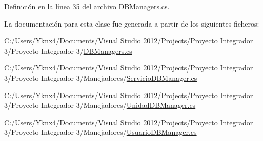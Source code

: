 Definición en la línea 35 del archivo D\-B\-Managers.\-cs.



La documentación para esta clase fue generada a partir de los siguientes ficheros\-:\begin{DoxyCompactItemize}
\item 
C\-:/\-Users/\-Yknx4/\-Documents/\-Visual Studio 2012/\-Projects/\-Proyecto Integrador 3/\-Proyecto Integrador 3/\hyperlink{_d_b_managers_8cs}{D\-B\-Managers.\-cs}\item 
C\-:/\-Users/\-Yknx4/\-Documents/\-Visual Studio 2012/\-Projects/\-Proyecto Integrador 3/\-Proyecto Integrador 3/\-Manejadores/\hyperlink{_servicio_d_b_manager_8cs}{Servicio\-D\-B\-Manager.\-cs}\item 
C\-:/\-Users/\-Yknx4/\-Documents/\-Visual Studio 2012/\-Projects/\-Proyecto Integrador 3/\-Proyecto Integrador 3/\-Manejadores/\hyperlink{_unidad_d_b_manager_8cs}{Unidad\-D\-B\-Manager.\-cs}\item 
C\-:/\-Users/\-Yknx4/\-Documents/\-Visual Studio 2012/\-Projects/\-Proyecto Integrador 3/\-Proyecto Integrador 3/\-Manejadores/\hyperlink{_usuario_d_b_manager_8cs}{Usuario\-D\-B\-Manager.\-cs}\end{DoxyCompactItemize}
